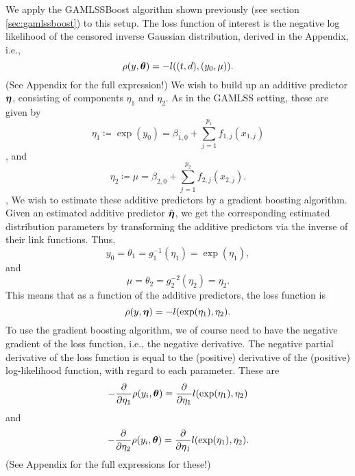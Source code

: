 We apply the GAMLSSBoost algorithm shown previously (see section \ref{sec:gamlssboost}) to this setup. The loss function of interest is
the negative log likelihood of the censored inverse Gaussian distribution, derived in the Appendix, i.e.,
\begin{equation*}
    \rho(y,\boldsymbol{\theta})=-l((t,d), (y_0,\mu)).
\end{equation*}
(See Appendix for the full expression!)
We wish to build up an additive predictor $\boldsymbol{\eta}$, consisting of components $\eta_1$ and $\eta_2$. As in the GAMLSS setting, these are given by
\begin{equation}
    \eta_1\coloneqq \exp(y_0)=\beta_{1,0}+\sum_{j=1}^{p_1}f_{1,j}(x_{1,j})
\end{equation},
and
\begin{equation}
    \eta_2\coloneqq \mu=\beta_{2,0}+\sum_{j=1}^{p_2}f_{2,j}(x_{2,j}).
\end{equation},
We wish to estimate these additive predictors by a gradient boosting algorithm.
Given an estimated additive predictor $\hat{\boldsymbol{\eta}}$, we get the corresponding estimated distribution parameters by
transforming the additive predictors via the inverse of their link functions. Thus,
\begin{equation}
    y_0=\theta_1=g_1^{-1}(\eta_1)=\exp(\eta_1),
\end{equation}
and
\begin{equation}
    \mu=\theta_2=g_2^{-2}(\eta_2)=\eta_2.
\end{equation}
This means that as a function of the additive predictors, the loss function is
\begin{equation*}
    \rho(y,\boldsymbol{\eta})=-l(\exp(\eta_1), \eta_2).
\end{equation*}
To use the gradient boosting algorithm, we of course need to have the negative gradient of the loss function, i.e.,
the negative derivative. The negative partial derivative of the loss function is equal to the (positive) derivative of the (positive) 
log-likelihood function, with regard to each parameter. These are
\begin{equation}
    -\frac{\partial}{\partial\eta_1}\rho(y_i,\boldsymbol{\theta})=\frac{\partial}{\partial\eta_1}l(\exp(\eta_1), \eta_2)
\end{equation}
and
\begin{equation}
    -\frac{\partial}{\partial\eta_2}\rho(y_i,\boldsymbol{\theta})=\frac{\partial}{\partial\eta_1}l(\exp(\eta_1), \eta_2).
\end{equation}
(See Appendix for the full expressions for these!)

